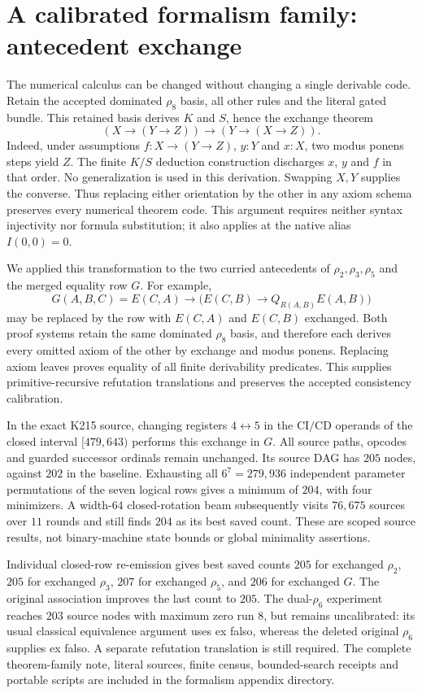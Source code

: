 \section{A calibrated formalism family: antecedent exchange}
The numerical calculus can be changed without changing a single derivable
code. Retain the accepted dominated $\rho_8$ basis, all other rules and the
literal gated bundle. This retained basis derives $K$ and $S$, hence the
exchange theorem
\[
 (X\to(Y\to Z))\to(Y\to(X\to Z)).
\]
Indeed, under assumptions $f:X\to(Y\to Z)$, $y:Y$ and $x:X$, two modus
ponens steps yield $Z$. The finite $K/S$ deduction construction discharges
$x$, $y$ and $f$ in that order. No generalization is used in this derivation.
Swapping $X,Y$ supplies the converse. Thus replacing either orientation by
the other in any axiom schema preserves every numerical theorem code.
This argument requires neither syntax injectivity nor formula substitution;
it also applies at the native alias $I(0,0)=0$.

We applied this transformation to the two curried antecedents of
$\rho_2,\rho_3,\rho_5$ and the merged equality row $G$.
For example,
\[
 G(A,B,C)=E(C,A)\to
       \bigl(E(C,B)\to Q_{R(A,B)}E(A,B)\bigr)
\]
may be replaced by the row with $E(C,A)$ and $E(C,B)$ exchanged.
Both proof systems retain the same dominated $\rho_8$ basis, and therefore
each derives every omitted axiom of the other by exchange and modus ponens.
Replacing axiom leaves proves equality of all finite derivability predicates.
This supplies primitive-recursive refutation translations and preserves the
accepted consistency calibration.

In the exact K215 source, changing registers $4\leftrightarrow5$ in the
$\mathrm{CI}/\mathrm{CD}$ operands of the closed interval $[479,643)$
performs this exchange in $G$. All source paths, opcodes and guarded
successor ordinals remain unchanged. Its source DAG has $205$ nodes,
against $202$ in the baseline. Exhausting all $6^7=279{,}936$ independent
parameter permutations of the seven logical rows gives a minimum of $204$,
with four minimizers. A width-$64$ closed-rotation beam subsequently visits
$76{,}675$ sources over $11$ rounds and still finds $204$ as its best saved
count. These are scoped source results, not binary-machine state bounds or
global minimality assertions.

Individual closed-row re-emission gives best saved counts $205$ for exchanged
$\rho_2$, $205$ for exchanged $\rho_3$, $207$ for exchanged $\rho_5$, and $206$
for exchanged $G$. The original association improves the last count to $205$.
The dual-$\rho_6$ experiment reaches $203$ source nodes with maximum zero run
$8$, but remains uncalibrated: its usual classical equivalence argument uses
ex falso, whereas the deleted original $\rho_6$ supplies ex falso. A separate
refutation translation is still required. The complete theorem-family note,
literal sources, finite census, bounded-search receipts and portable scripts
are included in the formalism appendix directory.


